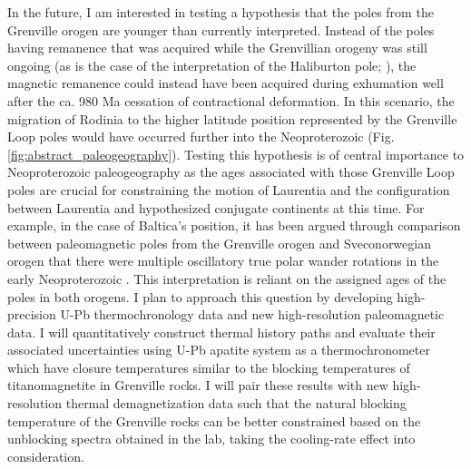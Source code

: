 In the future, I am interested in testing a hypothesis that the poles from the Grenville orogen are younger than currently interpreted. Instead of the poles having remanence that was acquired while the Grenvillian orogeny was still ongoing (as is the case of the interpretation of the Haliburton pole; \citealp{Warnock2000a}), the magnetic remanence could instead have been acquired during exhumation well after the ca. 980 Ma cessation of contractional deformation. In this scenario, the migration of Rodinia to the higher latitude position represented by the Grenville Loop poles would have occurred further into the Neoproterozoic (Fig. \ref{fig:abstract_paleogeography}). Testing this hypothesis is of central importance to Neoproterozoic paleogeography as the ages associated with those Grenville Loop poles are crucial for constraining the motion of Laurentia and the configuration between Laurentia and hypothesized conjugate continents at this time. For example, in the case of Baltica's position, it has been argued through comparison between paleomagnetic poles from the Grenville orogen and Sveconorwegian orogen that there were multiple oscillatory true polar wander rotations in the early Neoproterozoic \citep{Evans2015a, Gong2018a}. This interpretation is reliant on the assigned ages of the poles in both orogens. I plan to approach this question by developing high-precision U-Pb thermochronology data and new high-resolution paleomagnetic data. I will quantitatively construct thermal history paths and evaluate their associated uncertainties using U-Pb apatite system as a thermochronometer which have closure temperatures similar to the blocking temperatures of titanomagnetite in Grenville rocks. I will pair these results with new high-resolution thermal demagnetization data such that the natural blocking temperature of the Grenville rocks can be better constrained based on the unblocking spectra obtained in the lab, taking the cooling-rate effect into consideration. 